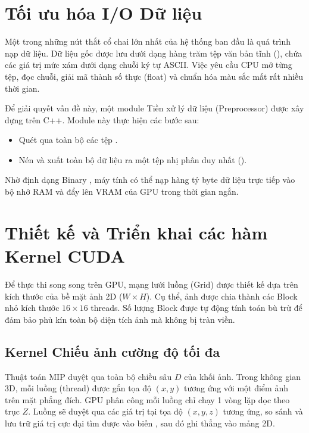 
\section{Tối ưu hóa I/O Dữ liệu}

Một trong những nút thắt cổ chai lớn nhất của hệ thống ban đầu là quá trình nạp dữ liệu. Dữ liệu gốc được lưu dưới dạng hàng trăm tệp văn bản tĩnh (), chứa các giá trị mức xám dưới dạng chuỗi ký tự ASCII. Việc yêu cầu CPU mở từng tệp, đọc chuỗi, giải mã thành số thực (float) và chuẩn hóa màu sắc mất rất nhiều thời gian.

Để giải quyết vấn đề này, một module Tiền xử lý dữ liệu (Preprocessor) được xây dựng trên C++. Module này thực hiện các bước sau:

\begin{itemize}
    \item Quét qua toàn bộ các tệp .
    \item Nén và xuất toàn bộ dữ liệu ra một tệp nhị phân duy nhất ().
\end{itemize}

Nhờ định dạng Binary , máy tính có thể nạp hàng tỷ byte dữ liệu trực tiếp vào bộ nhớ RAM và đẩy lên VRAM của GPU trong thời gian ngắn.


\section{Thiết kế và Triển khai các hàm Kernel CUDA}

Để thực thi song song trên GPU, mạng lưới luồng (Grid) được thiết kế dựa trên kích thước của bề mặt ảnh 2D ($W \times H$). Cụ thể, ảnh được chia thành các Block nhỏ kích thước $16 \times 16$ threads. Số lượng Block được tự động tính toán bù trừ để đảm bảo phủ kín toàn bộ diện tích ảnh mà không bị tràn viền.



\subsection{Kernel Chiếu ảnh cường độ tối đa}

Thuật toán MIP duyệt qua toàn bộ chiều sâu $D$ của khối ảnh. Trong không gian 3D, mỗi luồng (thread) được gắn tọa độ $(x, y)$ tương ứng với một điểm ảnh trên mặt phẳng đích. GPU phân công mỗi luồng chỉ chạy 1 vòng lặp dọc theo trục $Z$. Luồng sẽ duyệt qua các giá trị tại tọa độ $(x, y, z)$ tương ứng, so sánh và lưu trữ giá trị cực đại tìm được vào biến , sau đó ghi thẳng vào mảng  2D.

